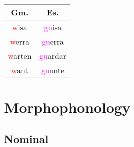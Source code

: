 \documentclass{report}
\begin{document}
\begin{tcolorbox}[title=Fortition of /w/ in Germanic Loanwords]
  
\end{tcolorbox}

\begin{tabular}{c c}
  Gm. & Es. \\  
  \hline
  \textcolor{red}{w}isa & \textcolor{magenta}{gu}isa \\
  \textcolor{red}{w}erra & \textcolor{magenta}{gu}erra \\
  \textcolor{red}{w}arten & \textcolor{magenta}{gu}ardar \\
  \textcolor{red}{w}ant & \textcolor{magenta}{gu}ante \\
\end{tabular}

\begin{tcolorbox}[title=Deaspiration]
  
\end{tcolorbox}

\begin{tcolorbox}[title=Nasal Spirant Law]

\end{tcolorbox}

\begin{tcolorbox}[title=Elision of Intervocalic /g/]

\end{tcolorbox}

\begin{tcolorbox}[title=Elision of Coda /m/]
  
\end{tcolorbox}

\begin{tcolorbox}[title=Palatalization and Affrication of Dentals]

\end{tcolorbox}

\begin{tcolorbox}[title=Palatalization of Velars]

\end{tcolorbox}

\section{Morphophonology}

\subsection{Nominal}
\end{document}
